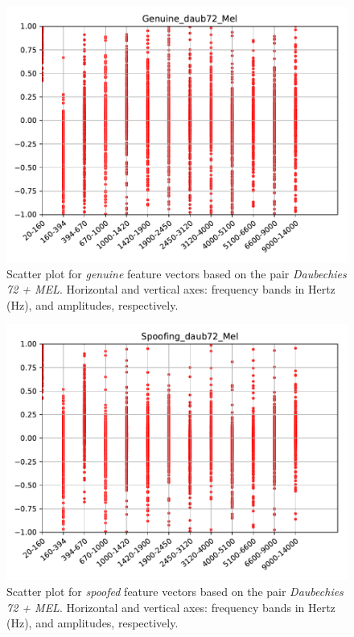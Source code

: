 		\begin{figure}[H]
			\centering
			\includegraphics[scale=.7]{images/results/barkVersusMel/Genuine_daub72_Mel.pdf}
			\caption{Scatter plot for \textit{genuine} feature vectors based on the pair \textit{Daubechies 72 + MEL}. Horizontal and vertical axes: frequency bands in Hertz (Hz), and amplitudes, respectively.}
			\label{fig:livedaub72mel}
		\end{figure}
		\begin{figure}[H]
			\centering
			\includegraphics[scale=.7]{images/results/barkVersusMel/Spoofing_daub72_Mel.pdf}
			\caption{Scatter plot for \textit{spoofed} feature vectors based on the pair \textit{Daubechies 72 + MEL}. Horizontal and vertical axes: frequency bands in Hertz (Hz), and amplitudes, respectively.}
			\label{fig:spoofingdaub72mel}
		\end{figure}

